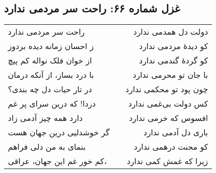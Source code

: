 \begin{center}
\section*{غزل شماره ۶۶: راحت سر مردمی ندارد}
\label{sec:066}
\begin{longtable}{l p{0.5cm} r}
راحت سر مردمی ندارد
&&
دولت دل همدمی ندارد
\\
ز احسان زمانه دیده بردوز
&&
کو دیدهٔ مردمی ندارد
\\
از خوان فلک نواله کم پیچ
&&
کو گردهٔ گندمی ندارد
\\
با درد بساز، از آنکه درمان
&&
با جان تو محرمی ندارد
\\
در تار حیات دل چه بندی؟
&&
چون پود تو محکمی ندارد
\\
دردا! که درین سرای پر غم
&&
کس دولت بی‌غمی ندارد
\\
دارد همه چیز آدمی زاد
&&
افسوس که خرمی ندارد
\\
گر خوشدلیی درین جهان هست
&&
باری دل آدمی ندارد
\\
بنمای به من دلی فراهم
&&
کو محنت درهمی ندارد
\\
کم خور غم این جهان، عراقی،
&&
زیرا که غمش کمی ندارد
\\
\end{longtable}
\end{center}
